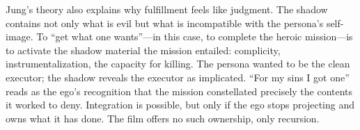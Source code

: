 Jung's theory also explains why fulfillment feels like judgment. The shadow contains not only
what is evil but what is incompatible with the persona's self-image. To ``get what one
wants''---in this case, to complete the heroic mission---is to activate the shadow material
the mission entailed: complicity, instrumentalization, the capacity for killing. The persona
wanted to be the clean executor; the shadow reveals the executor as implicated. ``For my sins
I got one'' reads as the ego's recognition that the mission constellated precisely the
contents it worked to deny. Integration is possible, but only if the ego stops projecting and
owns what it has done. The film offers no such ownership, only recursion.
